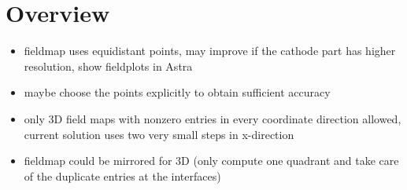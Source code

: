 \section{Overview}
\begin{itemize}
  \item fieldmap uses equidistant points, may improve if the cathode part has higher resolution, show fieldplots in Astra
  \item maybe choose the points explicitly to obtain sufficient accuracy
  \item only 3D field maps with nonzero entries in every coordinate direction allowed, current solution uses two very small steps in x-direction
  \item fieldmap could be mirrored for 3D (only compute one quadrant and take care of the duplicate entries at the interfaces)
\end{itemize}

\begin{center}
\begin{figure}
  
\end{figure}
\end{center}

\begin{center}
\begin{figure}
  
\end{figure}
\end{center}

\begin{center}
\begin{figure}
  
\end{figure}
\end{center}

\begin{figure}
  \hspace{-2.5cm}
  
\end{figure}
